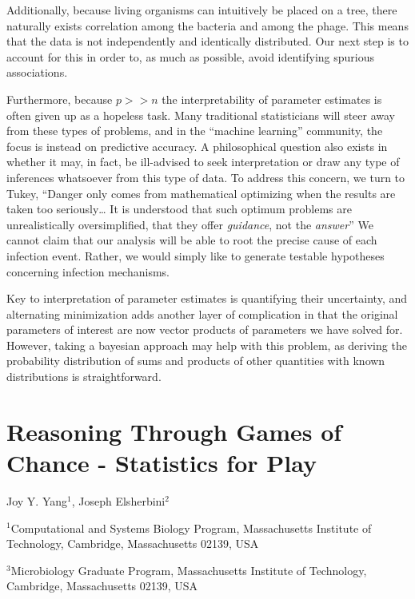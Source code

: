 \documentclass[12pt,twoside]{mitthesis-manusdown}
\begin{document}
Additionally, because living organisms can intuitively be placed on a
tree, there naturally exists correlation among the bacteria and among
the phage. This means that the data is not independently and identically
distributed. Our next step is to account for this in order to, as much
as possible, avoid identifying spurious associations.

Furthermore, because \(p>>n\) the interpretability of parameter
estimates is often given up as a hopeless task. Many traditional
statisticians will steer away from these types of problems, and in the
``machine learning'' community, the focus is instead on predictive
accuracy. A philosophical question also exists in whether it may, in
fact, be ill-advised to seek interpretation or draw any type of
inferences whatsoever from this type of data. To address this concern,
we turn to Tukey, ``Danger only comes from mathematical optimizing when
the results are taken too seriously\ldots{} It is understood that such
optimum problems are unrealistically oversimplified, that they offer
\emph{guidance}, not the \emph{answer}'' We cannot claim that our
analysis will be able to root the precise cause of each infection event.
Rather, we would simply like to generate testable hypotheses concerning
infection mechanisms.

Key to interpretation of parameter estimates is quantifying their
uncertainty, and alternating minimization adds another layer of
complication in that the original parameters of interest are now vector
products of parameters we have solved for. However, taking a bayesian
approach may help with this problem, as deriving the probability
distribution of sums and products of other quantities with known
distributions is straightforward.

\chapter{Reasoning Through Games of Chance - Statistics for
Play}\label{reasoning-through-games-of-chance---statistics-for-play}

\singlespace
Joy Y. Yang\(^1\), Joseph Elsherbini\(^2\) \newline 

\noindent \(^1\)Computational and Systems Biology Program, Massachusetts
Institute of Technology, Cambridge, Massachusetts 02139, USA

\noindent \(^3\)Microbiology Graduate Program, Massachusetts Institute
of Technology, Cambridge, Massachusetts 02139, USA
\end{document}
